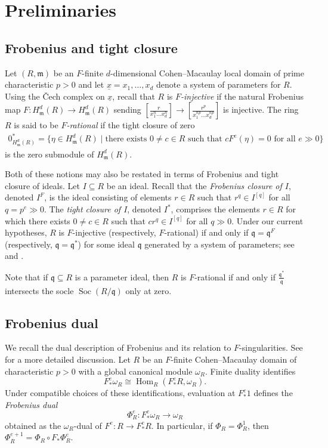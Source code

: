 \documentclass[reqno,11pt]{amsart}
\numberwithin{equation}{section}
\theoremstyle{definition}
\theoremstyle{definition}
\theoremstyle{definition}
\theoremstyle{remark}
\newcommand{\Soc}{\operatorname{Soc}}
\newcommand{\Hom}{\operatorname{Hom}}
\newcommand{\fm}{\mathfrak{m}}
\newcommand{\fq}{\mathfrak{q}}
\begin{document}
\section{Preliminaries}


\subsection{Frobenius and tight closure}
Let $(R,\fm)$ be an $F$-finite $d$-dimensional Cohen--Macaulay local domain of prime characteristic $p>0$ and let $\underline{x}=x_1,\dots, x_d$ denote a system of parameters for $R$. Using the \v{C}ech complex on $\underline{x}$, recall that $R$ is \emph{$F$-injective} if the natural Frobenius map $F:H^d_\fm(R)\to H^d_\fm(R)$ sending $\left[\frac{r}{x_1^n\dots x_d^n}\right]\to \left[\frac{r^p}{x_1^{np}\dots x_d^{np}}\right]$ is injective. The ring $R$ is said to be \emph{$F$-rational} if the tight closure of zero
\begin{align*}
    0^*_{H^d_\fm(R)}=\{\eta\in H^d_\fm(R)\mid \text{there exists } 0\neq c\in R \text{ such that }cF^e(\eta)=0\text{ for all }e\gg0\}
\end{align*}
is the zero submodule of $H^d_\fm(R)$.

Both of these notions may also be restated in terms of Frobenius and tight closure of ideals. Let $I\subseteq R$ be an ideal. Recall that the \emph{Frobenius closure of $I$}, denoted $I^F$, is the ideal consisting of elements $r\in R$ such that $r^q\in I^{[q]}$ for all $q=p^e\gg 0$. The \emph{tight closure of $I$}, denoted $I^*$, comprises the elements $r\in R$ for which there exists $0\neq c\in R$ such that $cr^q\in I^{[q]}$ for all $q\gg 0$. Under our current hypotheses, $R$ is $F$-injective (respectively, $F$-rational) if and only if $\fq=\fq^F$ (respectively, $\fq=\fq^*$) for some ideal $\fq$ generated by a system of parameters; see \cite[Corollary 3.9]{QS17} and \cite[Theorem 4.2(d)]{HH94a}.

Note that if $\fq\subseteq R$ is a parameter ideal, then $R$ is $F$-rational if and only if $\frac{\fq^*}{\fq}$ intersects the socle $\Soc(R/\fq)$ only at zero.


\subsection{Frobenius dual}
\label{subsection: Frobenius dual}

We recall the dual description of Frobenius and its relation to $F$-singularities. See \cite[Section~2.2]{DSPS25} for a more detailed discussion. Let $R$ be an $F$-finite Cohen--Macaulay domain of characteristic $p>0$ with a global canonical module $\omega_R$. Finite duality identifies
\[
    F_*^e\omega_R\cong \Hom_R(F_*^eR,\omega_R).
\]
Under compatible choices of these identifications, evaluation at $F_*^e1$ defines the \emph{Frobenius dual}
\[
    \Phi_R^e:F_*^e\omega_R\longrightarrow\omega_R
\]
obtained as the $\omega_R$-dual of $F^e:R\to F^e_*R$. In particular, if $\Phi_R = \Phi_R^1$, then $\Phi_R^{e+1}=\Phi_R\circ F_*\Phi_R^e$.
\end{document}
